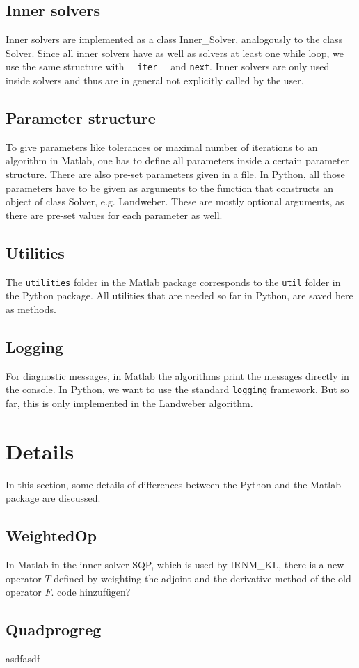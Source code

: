 \documentclass[12pt]{scrartcl}
\begin{document}
\subsection{Inner solvers}
Inner solvers are implemented as a class Inner\_Solver, analogously to the class Solver. Since all inner solvers have as well as solvers at least one while loop, we use the same structure with \texttt{\_\_iter\_\_} and \texttt{next}. Inner solvers are only used inside solvers and thus are in general not explicitly called by the user.
\subsection{Parameter structure}
To give parameters like tolerances or maximal number of iterations to an algorithm in Matlab, one has to define all parameters inside a certain parameter structure. There are also pre-set parameters given in a file. In Python, all those parameters have to be given as arguments to the function that constructs an object of class Solver, e.g. Landweber. These are mostly optional arguments, as there are pre-set values for each parameter as well.
\subsection{Utilities}
The \texttt{utilities} folder in the Matlab package corresponds to the \texttt{util} folder in the Python package. All utilities that are needed so far in Python, are saved here as methods.
\subsection{Logging}
For diagnostic messages, in Matlab the algorithms print the messages directly in the console. In Python, we want to use the standard \texttt{logging} framework. But so far, this is only implemented in the Landweber algorithm.
\section{Details}
In this section, some details of differences between the Python and the Matlab package are discussed.
\subsection{WeightedOp}
In Matlab in the inner solver SQP, which is used by IRNM\_KL, there is a new operator $T$ defined by weighting the adjoint and the derivative method of the old operator $F$.
code hinzufügen?
\subsection{Quadprogreg}
asdfasdf
\end{document}
